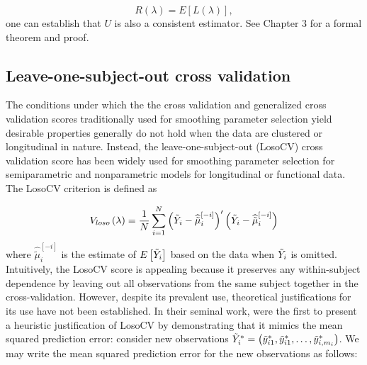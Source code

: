 \[
 R\left(\lambda\right) = E\left[L\left(\lambda\right)\right],
 \]
\noindent
one can establish that $U$ is also a consistent estimator. See \citet{gu2013smoothing} Chapter 3 for a formal theorem and proof.


\subsection{Leave-one-subject-out cross validation}  
The conditions under which the the cross validation and generalized cross validation scores traditionally used for smoothing parameter selection yield desirable properties generally do not hold when the data are clustered or longitudinal in nature. Instead, the leave-one-subject-out (LosoCV) cross validation score has been widely used for smoothing parameter selection for semiparametric and nonparametric models for longitudinal or functional data. The LosoCV criterion is defined as

\begin{equation} \label{eq:LOSOCV}
V_{loso}\left(\lambda\right) = \frac{1}{N}\sum_{i=1}^N \left( \tilde{Y}_i - \widehat{\tilde{\mu}}^{\left[-i\right]}_{i}\right)'\left( \tilde{Y}_i -  \widehat{\tilde{\mu}}^{\left[-i\right]}_{i}\right)
\end{equation}
\noindent
where $\widehat{\tilde{\mu}}^{\left[-i\right]}_{i}$ is the estimate of $E\left[ \tilde{Y}_i \right]$ based on the data when $\tilde{Y}_i$ is omitted. Intuitively, the LosoCV score is appealing because it preserves any within-subject dependence by leaving out all observations from the same subject together in the cross-validation.  However, despite its prevalent use, theoretical justifications for its use have not been established. In their seminal work, \citet{rice1991estimating} were the first to present a heuristic justification of LosoCV by demonstrating that it mimics the mean squared prediction error: consider new observations $\tilde{Y}^*_i = \left(\tilde{y}_{i1}^*, \tilde{y}_{i1}^*, \dots, \tilde{y}_{i, m_i}^*\right)$. We may write the mean squared prediction error for the new observations as follows:  
\bigskip 

